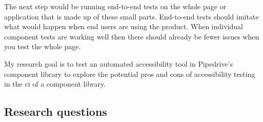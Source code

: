 \documentclass{master_thesis}
\begin{document}
The next step would be running end-to-end tests on the whole page or application that is made up of these small parts. End-to-end tests should imitate what would happen when end users are using the product. When individual component tests are working well then there should already be fewer issues when you test the whole page.

My research goal is to test an automated accessibility tool in Pipedrive's component library to explore the potential pros and cons of accessibility testing in the \ac{ci} of a component library.






\subsection{Research questions}
\end{document}
